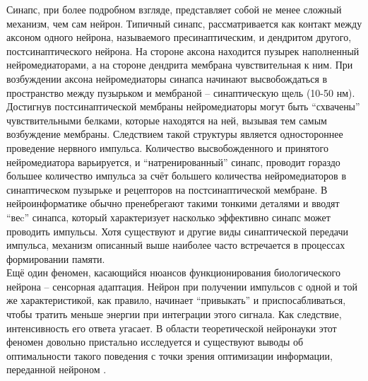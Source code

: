 \documentclass[a4paper,10pt]{article}
\begin{document}
\indent Синапс, при более подробном взгляде, представляет собой не менее сложный механизм, чем сам нейрон. Типичный синапс, рассматривается как контакт между аксоном одного нейрона, называемого пресинаптическим, и дендритом другого, постсинаптического нейрона. На стороне аксона находится пузырек наполненный нейромедиаторами, а на стороне дендрита мембрана чувствительная к ним. При возбуждении аксона нейромедиаторы синапса начинают высвобождаться в пространство между пузырьком и мембраной -- синаптическую щель (10-50 нм). Достигнув постсинаптической мембраны нейромедиаторы могут быть ``схвачены'' чувствительными белками, которые находятся на ней, вызывая тем самым возбуждение мембраны. Следствием такой структуры является одностороннее проведение нервного импульса. Количество высвобожденного и принятого нейромедиатора варьируется, и ``натренированный'' синапс, проводит гораздо большее количество импульса за счёт большего количества нейромедиаторов в синаптическом пузырьке и рецепторов на постсинаптической мембране. В нейроинформатике обычно пренебрегают такими тонкими деталями и вводят ``веc'' синапса, который характеризует насколько эффективно синапс может проводить импульсы. Хотя существуют и другие виды синаптической передачи импульса, механизм описанный выше наиболее часто встречается в процессах формировании памяти.\\
\indent Ещё один феномен, касающийся нюансов функционирования биологического нейрона -- сенсорная адаптация\cite{Phizi}. Нейрон при получении импульсов с одной и той же характеристикой, как правило, начинает ``привыкать'' и приспосабливаться, чтобы тратить меньше энергии при интеграции этого сигнала. Как следствие, интенсивность его ответа угасает. В области теоретической нейронауки этот феномен довольно пристально исследуется и существуют выводы об оптимальности такого поведения с точки зрения оптимизации информации, переданной нейроном \cite{Adapt,TripleAdapt}.
\end{document}
